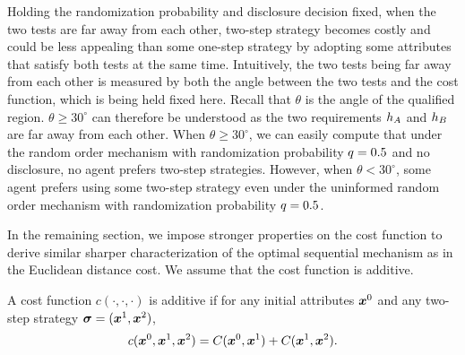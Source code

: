Holding the randomization probability and disclosure decision fixed, when the two tests are far away from each other, two-step strategy becomes costly and could be less appealing than some one-step strategy by adopting some attributes that satisfy both tests at the same time.
Intuitively, the two tests being far away from each other is measured by both the angle between the two tests and the cost function, which is being held fixed here.
 Recall that $\theta$ is the angle of the qualified region.
$\theta\geq30^{\circ}$ can therefore be understood as the two requirements $h_A$ and $h_B$ are far away from each other. 
When $ \theta\geq 30^{\circ}$, we can easily compute that under the random order mechanism with randomization probability $q=0.5$ and no disclosure, no agent prefers two-step strategies.
However, when $\theta< 30^{\circ}$, some agent prefers using some two-step strategy even under the uninformed random order mechanism with randomization probability $q=0.5$.



In the remaining section, we impose stronger properties on the cost function to derive similar sharper characterization of the optimal sequential mechanism as in the Euclidean distance cost. We assume that the cost function is additive.

\begin{assumption}[additive]\label{def: additive}
A cost function $c(\cdot,\cdot,\cdot)$ is additive if 
    for any initial attributes $\boldsymbol{x}^0$ and any two-step strategy $\boldsymbol{\sigma}=(\boldsymbol{x}^1, \boldsymbol{x}^2)$,
$$
c(\boldsymbol{x}^0,\boldsymbol{x}^1, \boldsymbol{x}^2) = C(\boldsymbol{x}^0,\boldsymbol{x}^1) + C(\boldsymbol{x}^1, \boldsymbol{x}^2).
$$
\end{assumption}



